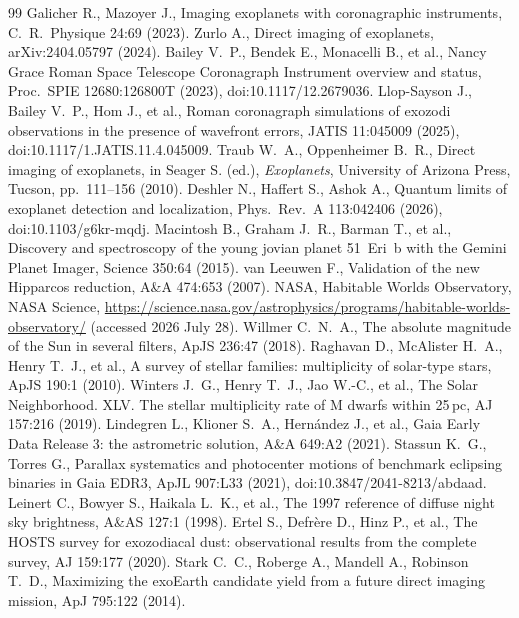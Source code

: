 \begin{thebibliography}{99}
 Galicher R., Mazoyer J., Imaging exoplanets with coronagraphic instruments, C.~R.~Physique 24:69 (2023).
 Zurlo A., Direct imaging of exoplanets, arXiv:2404.05797 (2024).
 Bailey V.~P., Bendek E., Monacelli B., et al., Nancy Grace Roman Space Telescope Coronagraph Instrument overview and status, Proc.~SPIE 12680:126800T (2023), doi:10.1117/12.2679036.
 Llop-Sayson J., Bailey V.~P., Hom J., et al., Roman coronagraph simulations of exozodi observations in the presence of wavefront errors, JATIS 11:045009 (2025), doi:10.1117/1.JATIS.11.4.045009.
 Traub W.~A., Oppenheimer B.~R., Direct imaging of exoplanets, in Seager S. (ed.), \emph{Exoplanets}, University of Arizona Press, Tucson, pp.~111--156 (2010).
 Deshler N., Haffert S., Ashok A., Quantum limits of exoplanet detection and localization, Phys.~Rev.~A 113:042406 (2026), doi:10.1103/g6kr-mqdj.
 Macintosh B., Graham J.~R., Barman T., et al., Discovery and spectroscopy of the young jovian planet 51~Eri~b with the Gemini Planet Imager, Science 350:64 (2015).
 van Leeuwen F., Validation of the new Hipparcos reduction, A\&A 474:653 (2007).
 NASA, Habitable Worlds Observatory, NASA Science, \url{https://science.nasa.gov/astrophysics/programs/habitable-worlds-observatory/} (accessed 2026 July 28).
 Willmer C.~N.~A., The absolute magnitude of the Sun in several filters, ApJS 236:47 (2018).
 Raghavan D., McAlister H.~A., Henry T.~J., et al., A survey of stellar families: multiplicity of solar-type stars, ApJS 190:1 (2010).
 Winters J.~G., Henry T.~J., Jao W.-C., et al., The Solar Neighborhood. XLV. The stellar multiplicity rate of M dwarfs within 25\,pc, AJ 157:216 (2019).
 Lindegren L., Klioner S.~A., Hern\'{a}ndez J., et al., Gaia Early Data Release 3: the astrometric solution, A\&A 649:A2 (2021).
 Stassun K.~G., Torres G., Parallax systematics and photocenter motions of benchmark eclipsing binaries in Gaia EDR3, ApJL 907:L33 (2021), doi:10.3847/2041-8213/abdaad.
 Leinert C., Bowyer S., Haikala L.~K., et al., The 1997 reference of diffuse night sky brightness, A\&AS 127:1 (1998).
 Ertel S., Defr\`{e}re D., Hinz P., et al., The HOSTS survey for exozodiacal dust: observational results from the complete survey, AJ 159:177 (2020).
 Stark C.~C., Roberge A., Mandell A., Robinson T.~D., Maximizing the exoEarth candidate yield from a future direct imaging mission, ApJ 795:122 (2014).

\end{thebibliography}
